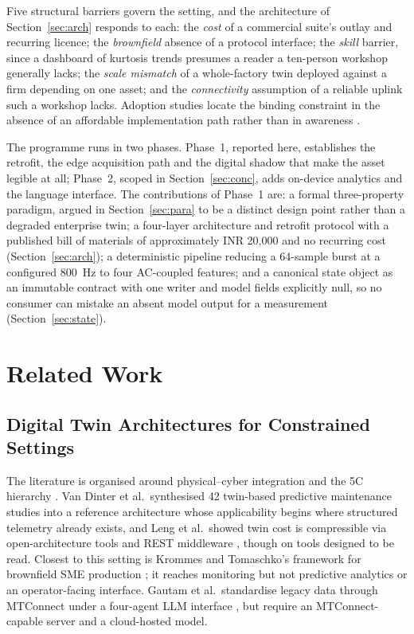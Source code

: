 \documentclass[conference]{IEEEtran}
\begin{document}
Five structural barriers govern the setting, and the architecture of
Section~\ref{sec:arch} responds to each: the \emph{cost} of a commercial
suite's outlay and recurring licence; the \emph{brownfield} absence of a
protocol interface; the \emph{skill} barrier, since a dashboard of kurtosis
trends presumes a reader a ten-person workshop generally lacks; the
\emph{scale mismatch} of a whole-factory twin deployed against a firm
depending on one asset; and the \emph{connectivity} assumption of a reliable
uplink such a workshop lacks. Adoption studies locate the binding constraint
in the absence of an affordable implementation path \cite{b33} rather than
in awareness \cite{b34}.

The programme runs in two phases. Phase~1, reported here, establishes the
retrofit, the edge acquisition path and the digital shadow that make the
asset legible at all; Phase~2, scoped in Section~\ref{sec:conc}, adds
on-device analytics and the language interface. The contributions of
Phase~1 are: a formal three-property paradigm, argued in
Section~\ref{sec:para} to be a distinct design point rather than a degraded
enterprise twin; a four-layer architecture and retrofit protocol with a
published bill of materials of approximately INR 20,000 and no recurring
cost (Section~\ref{sec:arch}); a deterministic pipeline reducing a
64-sample burst at a configured 800~Hz to four AC-coupled features; and a
canonical state object as an immutable contract with one writer and model
fields explicitly null, so no consumer can mistake an absent model output
for a measurement (Section~\ref{sec:state}).

\section{Related Work}

\subsection{Digital Twin Architectures for Constrained Settings}

The literature is organised around physical--cyber integration \cite{b1}
and the 5C hierarchy \cite{b2}. Van Dinter et al.\ synthesised 42
twin-based predictive maintenance studies into a reference architecture
\cite{b3} whose applicability begins where structured telemetry already
exists, and Leng et al.\ showed twin cost is compressible via
open-architecture tools and REST middleware \cite{b4}, though on tools
designed to be read. Closest to this setting is Krommes and Tomaschko's
framework for brownfield SME production \cite{b5}; it reaches monitoring but
not predictive analytics or an operator-facing interface. Gautam et al.\
standardise legacy data through MTConnect under a four-agent LLM interface
\cite{b6}, but require an MTConnect-capable server and a cloud-hosted
model.
\end{document}

